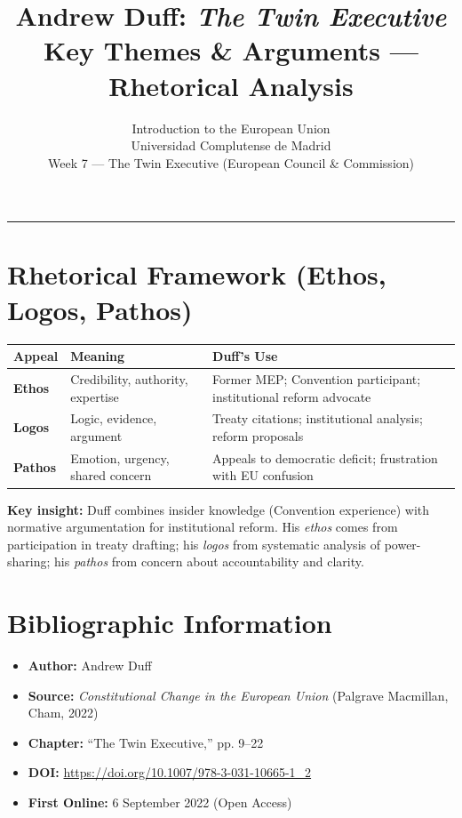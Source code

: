 \documentclass[11pt,a4paper]{article}
\begin{document}
\title{Andrew Duff: \textit{The Twin Executive}\\Key Themes \& Arguments --- Rhetorical Analysis}
\author{Introduction to the European Union\\Universidad Complutense de Madrid\\Week 7 --- The Twin Executive (European Council \& Commission)}
\date{}
\maketitle
\vspace{-1em}
\hrule
\vspace{1em}

\section*{Rhetorical Framework (Ethos, Logos, Pathos)}

\begin{table}[h]
\centering
\begin{tabular}{@{}lll@{}}
\toprule
\textbf{Appeal} & \textbf{Meaning} & \textbf{Duff's Use} \\
\midrule
\textbf{Ethos} & Credibility, authority, expertise & Former MEP; Convention participant; institutional reform advocate \\
\textbf{Logos} & Logic, evidence, argument & Treaty citations; institutional analysis; reform proposals \\
\textbf{Pathos} & Emotion, urgency, shared concern & Appeals to democratic deficit; frustration with EU confusion \\
\bottomrule
\end{tabular}
\end{table}

\textbf{Key insight:} Duff combines insider knowledge (Convention experience) with normative argumentation for institutional reform. His \textit{ethos} comes from participation in treaty drafting; his \textit{logos} from systematic analysis of power-sharing; his \textit{pathos} from concern about accountability and clarity.

\section*{Bibliographic Information}

\begin{itemize}
\item \textbf{Author:} Andrew Duff
\item \textbf{Source:} \textit{Constitutional Change in the European Union} (Palgrave Macmillan, Cham, 2022)
\item \textbf{Chapter:} ``The Twin Executive,'' pp. 9--22
\item \textbf{DOI:} \url{https://doi.org/10.1007/978-3-031-10665-1_2}
\item \textbf{First Online:} 6 September 2022 (Open Access)
\end{itemize}
\end{document}
